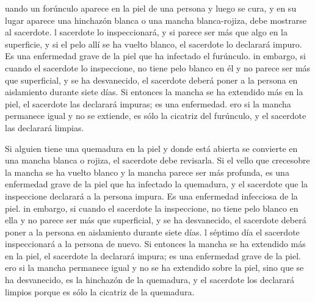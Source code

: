  uando un forúnculo aparece en la piel de una persona y
luego se cura,  y en su lugar aparece una hinchazón blanca
o una mancha blanca-rojiza, debe mostrarse al sacerdote.  l
sacerdote lo inspeccionará, y si parece ser más que algo en la
superficie, y si el pelo allí se ha vuelto blanco, el sacerdote lo
declarará impuro. Es una enfermedad grave de la piel que ha infectado el
furúnculo.  in embargo, si cuando el sacerdote lo
inspeccione, no tiene pelo blanco en él y no parece ser más que
superficial, y se ha desvanecido, el sacerdote deberá poner a la persona
en aislamiento durante siete días.  Si entonces la mancha
se ha extendido más en la piel, el sacerdote las declarará impuras; es
una enfermedad.  ero si la mancha permanece igual y no se
extiende, es sólo la cicatriz del furúnculo, y el sacerdote las
declarará limpias.

 Si alguien tiene una quemadura en la piel y donde está
abierta se convierte en una mancha blanca o rojiza,  el
sacerdote debe revisarla. Si el vello que crecesobre la mancha se ha
vuelto blanco y la mancha parece ser más profunda, es una enfermedad
grave de la piel que ha infectado la quemadura, y el sacerdote que la
inspeccione declarará a la persona impura. Es una enfermedad infecciosa
de la piel.  in embargo, si cuando el sacerdote la
inspeccione, no tiene pelo blanco en ella y no parece ser más que
superficial, y se ha desvanecido, el sacerdote deberá poner a la persona
en aislamiento durante siete días.  l séptimo día el
sacerdote inspeccionará a la persona de nuevo. Si entonces la mancha se
ha extendido más en la piel, el sacerdote la declarará impura; es una
enfermedad grave de la piel.  ero si la mancha permanece
igual y no se ha extendido sobre la piel, sino que se ha desvanecido, es
la hinchazón de la quemadura, y el sacerdote los declarará limpios
porque es sólo la cicatriz de la quemadura.

